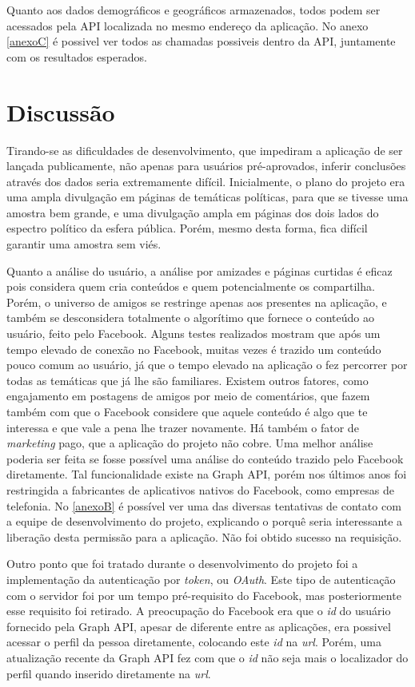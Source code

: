 \documentclass[
	12pt,				%
	oneside,			%
	a4paper,			%
	english,			%
	brazil				%
	]{abntex2ppgsi}
\begin{document}
Quanto aos dados demográficos e geográficos armazenados, todos podem ser acessados pela API localizada no mesmo endereço da aplicação. No anexo \ref{anexoC} é possivel ver todos as chamadas possiveis dentro da API, juntamente com os resultados esperados. 

\chapter{Discussão}

Tirando-se as dificuldades de desenvolvimento, que impediram a aplicação de ser lançada publicamente, não apenas para usuários pré-aprovados, inferir conclusões através dos dados seria extremamente difícil. Inicialmente, o plano do projeto era uma ampla divulgação em páginas de temáticas políticas, para que se tivesse uma amostra bem grande, e uma divulgação ampla em páginas dos dois lados do espectro político da esfera pública. Porém, mesmo desta forma, fica difícil garantir uma amostra sem viés. 

Quanto a análise do usuário, a análise por amizades e páginas curtidas é eficaz pois considera quem cria conteúdos e quem potencialmente os compartilha. Porém, o universo de amigos se restringe apenas aos presentes na aplicação, e também se desconsidera totalmente o algorítimo que fornece o conteúdo ao usuário, feito pelo Facebook. Alguns testes realizados mostram que após um tempo elevado de conexão no Facebook, muitas vezes é trazido um conteúdo pouco comum ao usuário, já que o tempo elevado na aplicação o fez percorrer por todas as temáticas que já lhe são familiares. Existem outros fatores, como engajamento em postagens de amigos por meio de comentários, que fazem também com que o Facebook considere que aquele conteúdo é algo que te interessa e que vale a pena lhe trazer novamente. Há também o fator de \textit{marketing} pago, que a aplicação do projeto não cobre. Uma melhor análise poderia ser feita se fosse possível uma análise do conteúdo trazido pelo Facebook diretamente. Tal funcionalidade existe na Graph API, porém nos últimos anos foi restringida a fabricantes de aplicativos nativos do Facebook, como empresas de telefonia. No \ref{anexoB} é possível ver uma das diversas tentativas de contato com a equipe de desenvolvimento do projeto, explicando o porquê seria interessante a liberação desta permissão para a aplicação. Não foi obtido sucesso na requisição.

Outro ponto que foi tratado durante o desenvolvimento do projeto foi a implementação da autenticação por \textit{token}, ou \textit{OAuth}. Este tipo de autenticação com o servidor foi por um tempo pré-requisito do Facebook, mas posteriormente esse requisito foi retirado. A preocupação do Facebook era que o \textit{id} do usuário fornecido pela Graph API, apesar de diferente entre as aplicações, era possivel acessar o perfil da pessoa diretamente, colocando este \textit{id} na \textit{url}. Porém, uma atualização recente da Graph API fez com que o \textit{id} não seja mais o localizador do perfil quando inserido diretamente na \textit{url}.
\end{document}
